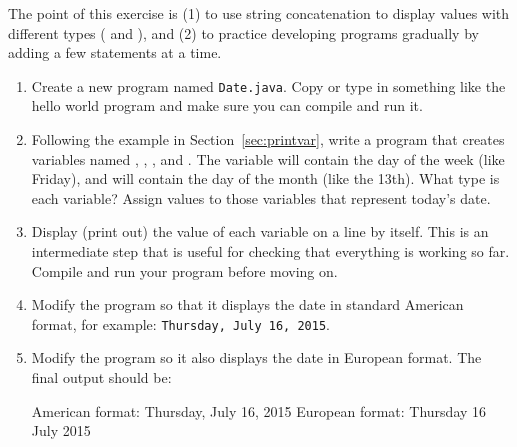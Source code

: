 \begin{exercise}
\label{ex:date}

The point of this exercise is (1) to use string concatenation to display values with different types ( and ), and (2) to practice developing programs gradually by adding a few statements at a time.

\begin{enumerate}

\item Create a new program named {\tt Date.java}.
Copy or type in something like the hello world program and make sure you can compile and run it.

\item Following the example in Section~\ref{sec:printvar}, write a program that creates variables named , , , and .
The variable  will contain the day of the week (like Friday), and  will contain the day of the month (like the 13th).
What type is each variable?
Assign values to those variables that represent today's date.

\item Display (print out) the value of each variable on a line by itself.
This is an intermediate step that is useful for checking that everything is working so far.
Compile and run your program before moving on.

\item Modify the program so that it displays the date in standard American format, for example: {\tt Thursday, July 16, 2015}.

\item Modify the program so it also displays the date in European format.
The final output should be:

\begin{stdout}
American format:
Thursday, July 16, 2015
European format:
Thursday 16 July 2015
\end{stdout}

\end{enumerate}

\end{exercise}


